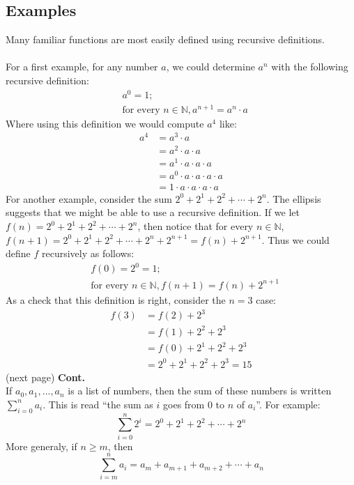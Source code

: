 \documentclass{report}
\theoremstyle{definition}
\begin{document}
\subsection{Examples}
Many familiar functions are most easily defined using recursive definitions.\\
\vspace{1mm}\\
For a first example, for any number $a$, we could determine $a^n$ with the following recursive definition:
\begin{align*}
&a^0=1;\\
&\text{for every }n\in\mathbb N,a^{n+1}=a^n\cdot a
\end{align*}
Where using this definition we would compute $a^4$ like:
\begin{align*}
a^4&=a^3\cdot a\\
&=a^2\cdot a\cdot a\\
&=a^1\cdot a\cdot a\cdot a\\
&=a^0\cdot a\cdot a\cdot a\cdot a\\
&=1\cdot a\cdot a\cdot a\cdot a
\end{align*}
For another example, consider the sum $2^0+2^1+2^2+\cdots+2^n$. The ellipsis suggests that we might be able to use a recursive definition. 
If we let $f(n)=2^0+2^1+2^2+\cdots+2^n$, then notice that for every $n\in\mathbb N$, $f(n+1)=2^0+2^1+2^2+\cdots+2^n+2^{n+1}=f(n)+2^{n+1}$. Thus we could define $f$ recursively as follows:
\begin{align*}
&f(0)=2^0=1;\\
&\text{for every }n\in\mathbb N,f(n+1)=f(n)+2^{n+1}
\end{align*}
As a check that this definition is right, consider the $n=3$ case:
\begin{align*}
f(3)&=f(2)+2^3\\
&=f(1)+2^2+2^3\\
&=f(0)+2^1+2^2+2^3\\
&=2^0+2^1+2^2+2^3=15
\end{align*}
(next page)\newpage
\noindent\textbf{Cont.}\\
If $a_0,a_1,\ldots,a_n$ is a list of numbers, then the sum of these numbers is written 
$\sum^n_{i=0}a_i$. This is read ``the sum as $i$ goes from 0 to $n$ of $a_i$''. For example:
\begin{equation*}
\sum^n_{i=0}2^i=2^0+2^1+2^2+\cdots+2^n
\end{equation*}
More generaly, if $n\geq m$, then 
\begin{equation*}
\sum^n_{i=m}a_i=a_m+a_{m+1}+a_{m+2}+\cdots+a_n
\end{equation*}
\end{document}
